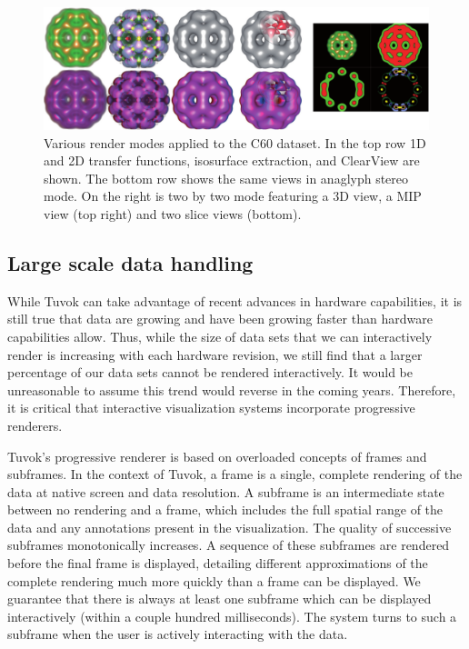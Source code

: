 \begin{figure}
	\includegraphics[width=\linewidth]{images/arch/c60modes}

  \caption{Various render modes applied to the C60 dataset.  In the
  top row 1D and 2D transfer functions, isosurface extraction, and
  ClearView are shown.  The bottom row shows the same views in anaglyph
  stereo mode.  On the right is two by two mode featuring a 3D view, a
  MIP view (top right) and two slice views (bottom).}
	\label{fig:modes}

\end{figure}

\subsection{Large scale data handling}
\label{sec:tvk-data}

While Tuvok can take advantage of recent advances in hardware
capabilities, it is still true that data are growing and have been
growing faster than hardware capabilities allow. Thus, while the size
of data sets that we can interactively render is increasing with each
hardware revision, we still find that a larger percentage of our data
sets cannot be rendered interactively.  It would be unreasonable to
assume this trend would reverse in the coming years. Therefore, it is
critical that interactive visualization systems incorporate progressive
renderers.

Tuvok's progressive renderer is based on overloaded
concepts of frames and subframes. In the context of Tuvok, a
frame is a single, complete rendering of the data at native
screen and data resolution. A subframe is an intermediate
state between no rendering and a frame, which includes the
full spatial range of the data and any annotations present in
the visualization. The quality of successive subframes
monotonically increases. A sequence of these subframes are
rendered before the final frame is displayed, detailing different
approximations of the complete rendering much more
quickly than a frame can be displayed. We guarantee that
there is always at least one subframe which can be displayed
interactively (within a couple hundred milliseconds). The
system turns to such a subframe when the user is actively
interacting with the data.

